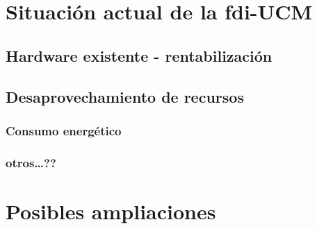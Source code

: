 \section{Situaci\'on actual de la fdi-UCM}

\subsection{Hardware existente - rentabilizaci\'on}

\subsection{Desaprovechamiento de recursos}

\subsubsection{Consumo energ\'etico}

\subsubsection{otros\ldots??}

\section{Posibles ampliaciones}
